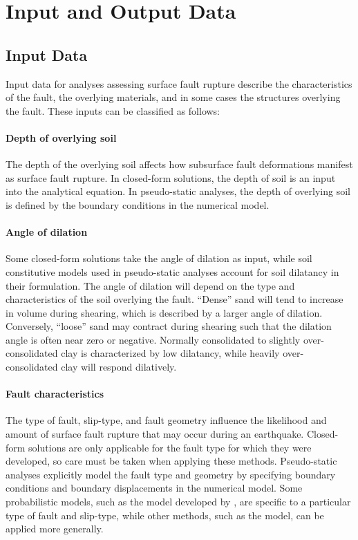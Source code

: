 \section{Input and Output Data}
\label{sec:eq_surface_rup_input_output}

\subsection{Input Data}

Input data for analyses assessing surface fault rupture describe the characteristics of the fault, the overlying materials, and in some cases the structures overlying the fault. These inputs can be classified as follows:

\paragraph{Depth of overlying soil}
The depth of the overlying soil affects how subsurface fault deformations manifest as surface fault rupture. In closed-form solutions, the depth of soil is an input into the analytical equation. In pseudo-static analyses, the depth of overlying soil is defined by the boundary conditions in the numerical model.

\paragraph{Angle of dilation}
Some closed-form solutions take the angle of dilation as input, while soil constitutive models used in pseudo-static analyses account for soil dilatancy in their formulation. The angle of dilation will depend on the type and characteristics of the soil overlying the fault. ``Dense'' sand will tend to increase in volume during shearing, which is described by a larger angle of dilation. Conversely, ``loose'' sand may contract during shearing such that the dilation angle is often near zero or negative. Normally consolidated to slightly over-consolidated clay is characterized by low dilatancy, while heavily over-consolidated clay will respond dilatively.

\paragraph{Fault characteristics}
The type of fault, slip-type, and fault geometry influence the likelihood and amount of surface fault rupture that may occur during an earthquake. Closed-form solutions are only applicable for the fault type for which they were developed, so care must be taken when applying these methods. Pseudo-static analyses explicitly model the fault type and geometry by specifying boundary conditions and boundary displacements in the numerical model. Some probabilistic models, such as the model developed by \citet{moss2011probabilistic}, are specific to a particular type of fault and slip-type, while other methods, such as the \citet{hecker2013variability} model, can be applied more generally.

